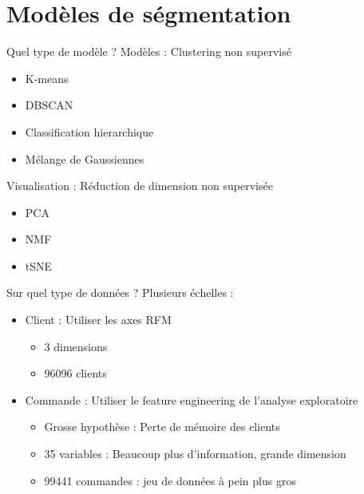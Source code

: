 \documentclass[10pt]{beamer}
\begin{document}
\section{Modèles de ségmentation}
\begin{frame}{Quel type de modèle ?}
    Modèles : Clustering non supervisé
    \begin{itemize}
        \item K-means
        \item DBSCAN
        \item Classification hierarchique
        \item Mélange de Gaussiennes\\
    \end{itemize}
    \vspace{0.5cm}
    Visualisation : Réduction de dimension non supervisée
    \begin{itemize}
        \item PCA
        \item NMF
        \item tSNE
    \end{itemize}
\end{frame}
\begin{frame}{Sur quel type de données ?}
    Plusieurs échelles : 
    \begin{itemize}
        \item Client : Utiliser les axes RFM
        \begin{itemize}
            \item 3 dimensions
            \item 96096 clients
        \end{itemize}
        \item Commande : Utiliser le feature engineering de l'analyse exploratoire
        \begin{itemize}
            \item Grosse hypothèse : Perte de mémoire des clients
            \item 35 variables : Beaucoup plus d'information, grande dimension 
            \item 99441 commandes : jeu de données à pein plus gros
        \end{itemize}
    \end{itemize}
\end{frame}
\end{document}
